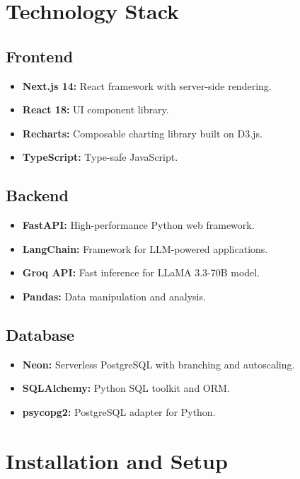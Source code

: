 \documentclass[12pt,a4paper]{article}
\begin{document}
\section{Technology Stack}

\subsection{Frontend}
\begin{itemize}
    \item \textbf{Next.js 14:} React framework with server-side rendering.
    \item \textbf{React 18:} UI component library.
    \item \textbf{Recharts:} Composable charting library built on D3.js.
    \item \textbf{TypeScript:} Type-safe JavaScript.
\end{itemize}

\subsection{Backend}
\begin{itemize}
    \item \textbf{FastAPI:} High-performance Python web framework.
    \item \textbf{LangChain:} Framework for LLM-powered applications.
    \item \textbf{Groq API:} Fast inference for LLaMA 3.3-70B model.
    \item \textbf{Pandas:} Data manipulation and analysis.
\end{itemize}

\subsection{Database}
\begin{itemize}
    \item \textbf{Neon:} Serverless PostgreSQL with branching and autoscaling.
    \item \textbf{SQLAlchemy:} Python SQL toolkit and ORM.
    \item \textbf{psycopg2:} PostgreSQL adapter for Python.
\end{itemize}

\section{Installation and Setup}
\end{document}
